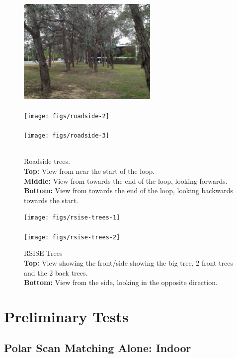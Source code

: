 \documentclass[12pt,oneside,a4paper]{book}
\begin{document}
\begin{figure}
  \centering
  \includegraphics[width=0.6\textwidth]{figs/roadside-1}\\
  ~\\
  \texttt{[image: figs/roadside-2]}\\
  ~\\
  \texttt{[image: figs/roadside-3]}\\
  ~\\
  \caption{Roadside trees.\\\textbf{Top:} View from near the start of
    the loop.\\\textbf{Middle:} View from towards the end of the loop,
  looking forwards.\\\textbf{Bottom:} View from towards the end of the
  loop, looking backwards towards the start.}
  \label{fig:roadside-trees}
\end{figure}


\begin{figure}
  \centering
  \texttt{[image: figs/rsise-trees-1]}\\
  ~\\
  \texttt{[image: figs/rsise-trees-2]}
  \caption{RSISE Trees\\\textbf{Top:} View showing the front/side
    showing the big tree, 2 front trees
    and the 2 back trees.\\\textbf{Bottom:} View from the side, looking
  in the opposite direction.}
  \label{fig:rsise-trees}
\end{figure}
\newpage


\section{Preliminary Tests}
\label{sec:preliminary-tests}
\subsection{Polar Scan Matching Alone: Indoor}
\label{sec:psm-indoor}
\end{document}
